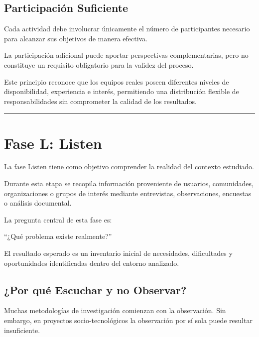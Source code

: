 \documentclass[14pt,a4paper,oneside]{extbook}
\begin{document}
\subsection{Participación Suficiente}

Cada actividad debe involucrar únicamente el número de participantes necesario para alcanzar sus objetivos de manera efectiva.

La participación adicional puede aportar perspectivas complementarias, pero no constituye un requisito obligatorio para la validez del proceso.

Este principio reconoce que los equipos reales poseen diferentes niveles de disponibilidad, experiencia e interés, permitiendo una distribución flexible de responsabilidades sin comprometer la calidad de los resultados.

\par\vspace{1.5em}\noindent\hfill\rule{0.25\textwidth}{0.6pt}\hfill\par\vspace{1.5em}

\section{Fase L: Listen}

La fase Listen tiene como objetivo comprender la realidad del contexto estudiado.

Durante esta etapa se recopila información proveniente de usuarios, comunidades, organizaciones o grupos de interés mediante entrevistas, observaciones, encuestas o análisis documental.

La pregunta central de esta fase es:

\begin{keyquestion}
\enquote{¿Qué problema existe realmente?}
\end{keyquestion}

El resultado esperado es un inventario inicial de necesidades, dificultades y oportunidades identificadas dentro del entorno analizado.

\subsection{¿Por qué Escuchar y no Observar?}

Muchas metodologías de investigación comienzan con la observación. Sin embargo, en proyectos socio-tecnológicos la observación por sí sola puede resultar insuficiente.
\end{document}

